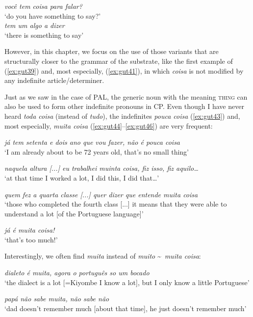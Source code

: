 \documentclass[output=paper,colorlinks,citecolor=brown]{langscibook}
\begin{document}
\ea \label{ex:gut41}
    \textit{você tem coisa para falar? }\\
    ‘do you have something to say?’\\
    
    \ex \label{ex:gut42}
    \textit{tem um algo a dizer}\\
    ‘there is something to say’\\
\z

However, in this chapter, we focus on the use of those variants that are structurally closer to the grammar of the substrate, like the first example of (\ref{ex:gut39}) and, most especially, (\ref{ex:gut41}), in which \textit{coisa} is not modified by any indefinite article\slash determiner.

Just as we saw in the case of PAL, the generic noun with the meaning \textsc{thing} can also be used to form other indefinite pronouns in CP. Even though I have never heard \textit{toda coisa} (instead of \textit{tudo}), the indefinites \textit{pouca coisa} (\ref{ex:gut43}) and, most especially, \textit{muita coisa} (\ref{ex:gut44}--\ref{ex:gut46}) are very frequent:

\ea \label{ex:gut43}
    \textit{já tem setenta e dois ano que vou fazer, não é pouca coisa}\\
    ‘I am already about to be 72 years old, that’s no small thing’
    
    \ex \label{ex:gut44}
    \textit{naquela altura [...] eu trabalhei muinta coisa, fiz isso, fiz aquilo…}\\
    ‘at that time I worked a lot, I did this, I did that…’
    
    \ex \label{ex:gut45}
    \textit{quem fez a quarta classe [...] quer dizer que entende muita coisa }\\
    ‘those who completed the fourth class [...] it means that they were able to understand a lot [of the Portuguese language]’
    
    \ex \label{ex:gut46}
    \textit{já é muita coisa!}\\
    ‘that’s too much!’
\z

Interestingly, we often find \textit{muita} instead of \textit{muito} \textasciitilde\ \textit{muita coisa}: 

\ea \label{ex:gut47}
    \textit{dialeto é muita, agora o português so um bocado}\\
    ‘the dialect is a lot [=Kiyombe I know a lot], but I only know a little Portuguese’
    
    \ex \label{ex:gut48}
    \textit{papá não sabe muita, não sabe não}\\
    ‘dad doesn’t remember much [about that time], he just doesn’t remember much’
\z
\end{document}
